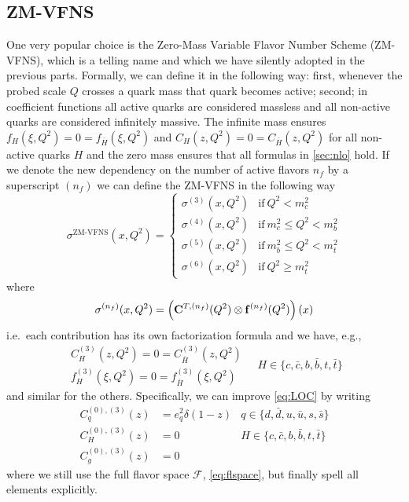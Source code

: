 \subsection{ZM-VFNS}

One very popular choice is the Zero-Mass Variable Flavor Number Scheme (ZM-VFNS), which is a telling name and which we have silently adopted in the previous parts.
Formally, we can define it in the following way:
first, whenever the probed scale $Q$ crosses a quark mass that quark becomes active;
second; in coefficient functions all active quarks are considered massless and all non-active quarks are considered infinitely massive.
The infinite mass ensures $f_H(\xi, Q^2) = 0 = f_{\bar H}(\xi, Q^2)$ and $C_H(z, Q^2) = 0 = C_{\bar H}(z, Q^2)$ for all non-active quarks $H$ and the zero mass ensures that all formulas in \cref{sec:nlo} hold.
If we denote the new dependency on the number of active flavors $n_f$ by a superscript $(n_f)$ we can define the ZM-VFNS in the following way
\begin{equation}
    \sigma^{\text{ZM-VFNS}}(x,Q^2) = \left\{ \begin{array}{ll}
        \sigma^\mathrm{(3)}(x,Q^2) &\text{if}~ Q^2 < m_c^2\\
        \sigma^\mathrm{(4)}(x,Q^2) &\text{if}~ m_c^2 \leq Q^2 < m_b^2\\
        \sigma^\mathrm{(5)}(x,Q^2) &\text{if}~ m_b^2 \leq Q^2 < m_t^2\\
        \sigma^\mathrm{(6)}(x,Q^2) &\text{if}~ Q^2 \geq m_t^2
    \end{array} \right. \label{eq:zmvfns}
\end{equation}
where
\begin{equation}
    \sigma^{(n_f)}(x,Q^2) = \left(\vb C^{T,(n_f)}(Q^2) \otimes \vb f^{(n_f)}(Q^2)\right)(x) \label{eq:factnf}
\end{equation}
i.e.\ each contribution has its own factorization formula and we have, e.g.,
\begin{equation}
    \begin{array}{l}
        C_H^{(3)}(z, Q^2) = 0 = C_{\bar H}^{(3)}(z, Q^2)\\
        f_H^{(3)}(\xi, Q^2) = 0 = f_{\bar H}^{(3)}(\xi, Q^2)
    \end{array}
    \quad H\in\{c,\bar c, b, \bar b, t, \bar t\}
\end{equation}
and similar for the others.
Specifically, we can improve \cref{eq:LOC} by writing
\begin{align}
    C_q^{(0),(3)}(z) &= e_q^2 \delta(1-z) & q\in\{d,\bar d, u, \bar u, s, \bar s\}\\
    C_H^{(0),(3)}(z) &= 0 & H\in\{c,\bar c, b, \bar b, t, \bar t\}\\
    C_g^{(0),(3)}(z) &= 0
\end{align}
where we still use the full flavor space $\mathcal F$, \cref{eq:flspace}, but finally spell all elements explicitly.

